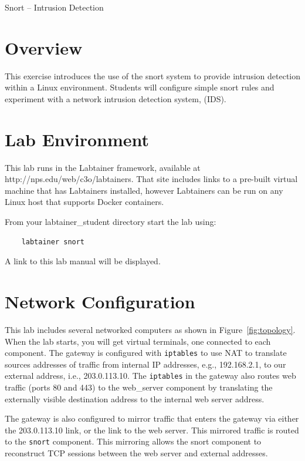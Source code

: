 


\begin{center}
{\LARGE Snort -- Intrusion Detection}
\vspace{0.1in}\\
\end{center}

\copyrightnotice

\section{Overview}
This exercise introduces the use of the snort system
to provide intrusion detection within a
Linux environment.  Students will configure simple 
snort rules and experiment with a network 
intrusion detection system, (IDS).  


\section{Lab Environment}
This lab runs in the Labtainer framework,
available at http://nps.edu/web/c3o/labtainers.
That site includes links to a pre-built virtual machine
that has Labtainers installed, however Labtainers can
be run on any Linux host that supports Docker containers.

From your labtainer_student directory start the lab using:
\begin{verbatim}
    labtainer snort
\end{verbatim}
\noindent A link to this lab manual will be displayed.  

\section{Network Configuration}
This lab includes several networked computers as shown in Figure~\ref{fig:topology}.
When the lab starts, you will get virtual terminals, one connected to each
component.  The gateway is configured with {\tt iptables} to use NAT to translate
sources addresses of traffic from internal IP addresses, e.g., 192.168.2.1, to
our external address, i.e., 203.0.113.10.  The {\tt iptables} in the gateway also
routes web traffic (ports 80 and 443) to the web\_server component by translating
the externally visible destination address to the internal web server address.

The gateway is also configured to mirror traffic that enters the gateway 
via either the 203.0.113.10 link, or the link to the web server.  This
mirrored traffic is routed to the {\tt snort} component.  This mirroring allows
the snort component to reconstruct TCP sessions between the web server and external
addresses.

